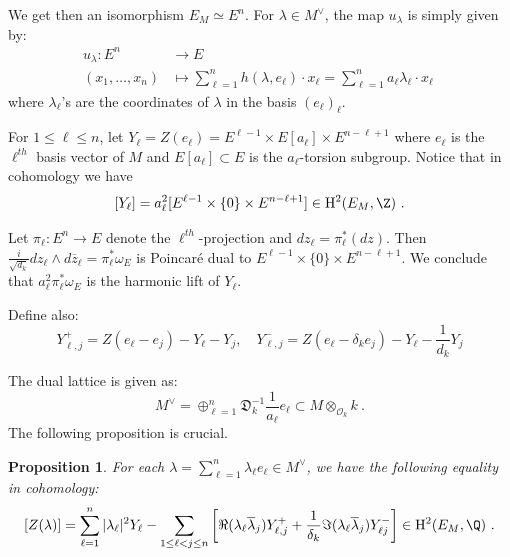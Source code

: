 \documentclass[11pt,letterpaper,english]{amsart}
\numberwithin{equation}{subsection}
\numberwithin{equation}{section}
\newcommand\cO{{\mathcal O}}
\newcommand\fD{{\mathfrak D}}
\theoremstyle{plain}
\newtheorem{proposition}[theorem]{Proposition}
\theoremstyle{remark}
\begin{document}
We get then an isomorphism $E_M\simeq E^n$. For $\lambda\in M^\vee$, the map $u_\lambda$ is simply given by: 
\begin{align*}u_{\lambda}:E^n&\rightarrow E\\
(x_1,\ldots,x_n)&\mapsto \sum_{\ell=1}^nh(\lambda,e_\ell)\cdot x_\ell=\sum_{\ell=1}^n a_\ell\lambda_\ell\cdot x_\ell\
\end{align*}
where $\lambda_\ell$'s are the coordinates of $\lambda$ in the basis $(e_\ell)_\ell$. 


For $1\leq \ell\leq n$, let $Y_\ell=Z(e_\ell)=E^{\ell-1}\times E[a_\ell]\times E^{n-\ell+1}$ where $e_\ell$ is the $\ell^{th}$ basis vector of $M$ and $E[a_\ell]\subset E$ is the $a_\ell$-torsion subgroup. Notice that in cohomology we have \[[Y_\ell]=a_\ell^2[E^{\ell-1}\times \{0\}\times E^{n-\ell+1}]\in \mathrm{H}^{2}(E_M,\Z)~.\]

Let $\pi_\ell: E^n\rightarrow E$ denote the $\ell^{th}$-projection and $dz_\ell=\pi_\ell^*(dz)$. Then $\frac{i}{\sqrt{d_k}}dz_\ell\wedge d\overline{z}_\ell=\pi_\ell^*\omega_E$ is Poincar\'e dual to $E^{\ell-1}\times \{0\}\times E^{n-\ell+1}$. We conclude that $a_\ell^2\pi_\ell^*\omega_E$ is the harmonic lift of $Y_\ell$. 

Define also: 
\[Y_{\ell,j}^+=Z(e_\ell-e_j)-Y_\ell-Y_j,\quad  Y_{\ell,j}^-=Z(e_\ell-\delta _ke_j)-Y_\ell-\frac{1}{d_k}Y_j\] 

The dual lattice is given as:\[M^\vee=\oplus_{\ell=1}^n\fD^{-1}_k \frac{1}{a_\ell}e_\ell\subset M\otimes_{\cO_k}k~.\] The following proposition is crucial.
\begin{proposition}\label{p:decomposition-cohomology-codim-1}
    For each $\lambda=\sum_{\ell=1}^{n}\lambda_\ell e_\ell\in M^\vee$, we have the following equality in cohomology: 
   \[[Z(\lambda)]=\sum_{\ell=1}^n|\lambda_\ell|^2Y_\ell-\sum_{1\leq \ell<j\leq n}\left[\Re(\lambda_\ell\overline \lambda_j)Y_{\ell,j}^++\frac{1}{\delta_k}\Im(\lambda_\ell\overline\lambda_j)Y_{\ell j}^-\right]\in \mathrm{H}^{2}(E_M,\Q)~.\]

\end{proposition}
\end{document}
